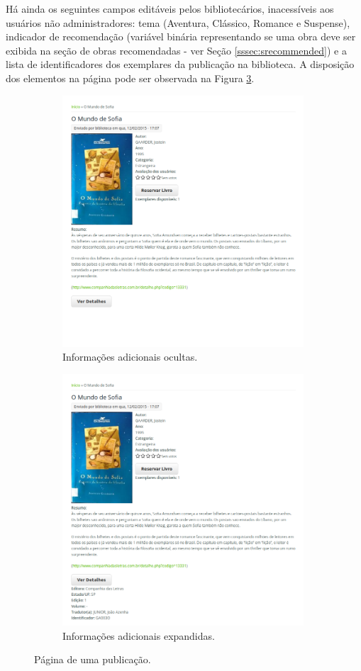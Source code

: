 \documentclass[a4paper]{article}
\begin{document}
Há ainda os seguintes campos editáveis pelos bibliotecários, inacessíveis aos usuários não administradores: tema (Aventura, Clássico, Romance e Suspense), indicador de recomendação (variável binária representando se uma obra deve ser exibida na seção de obras recomendadas - ver Seção \ref{sssec:srecommended}) e a lista de identificadores dos exemplares da publicação na biblioteca. A disposição dos elementos na página pode ser observada na Figura \ref{fig:publication}.

\begin{figure}
\begin{subfigure}{.5\textwidth}
  \includegraphics[width=90mm]{img/publication-colapsed.png}
  \caption{Informações adicionais ocultas.\label{colapsed}}
\end{subfigure}%
\begin{subfigure}{.4\textwidth}
  \includegraphics[width=90mm]{img/publication-expanded.png}
  \caption{Informações adicionais expandidas.\label{expanded}}
\end{subfigure}
\caption{Página de uma publicação.\label{fig:publication}}
\end{figure}
\end{document}
